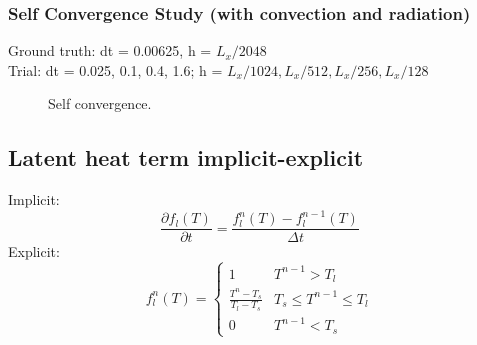 \documentclass[a4paper,12pt]{article}
\begin{document}
\subsubsection{Self Convergence Study (with convection and radiation)}

Ground truth: dt = 0.00625, h = $ L_x/2048 $\\
Trial: dt = 0.025, 0.1, 0.4, 1.6; h =  $ L_x/1024, L_x/512, L_x/256, L_x/128 $

\begin{figure}[!ht]
     \hfill
     \caption{Self convergence. }
     \label{fig:nolat_convergence}
   \end{figure}


\subsection{Latent heat term implicit-explicit}
Implicit: 
\begin{equation}
\frac{\partial   f_l(T)}{\partial t} = \frac{f_l^{n}(T)-f_l^{n-1}(T)}{\Delta t} 
\end{equation}
Explicit: 
\begin{equation}
f_l^{n}(T) =
\left\{
\begin{array}{cc}
1 & T^{n-1}>T_l \\
\frac{T^n-T_s}{T_l - T_s} & T_s \leq T^{n-1} \leq T_l \\
0 & T^{n-1} < T_s
\end{array}
\right.
\end{equation}
\end{document}
